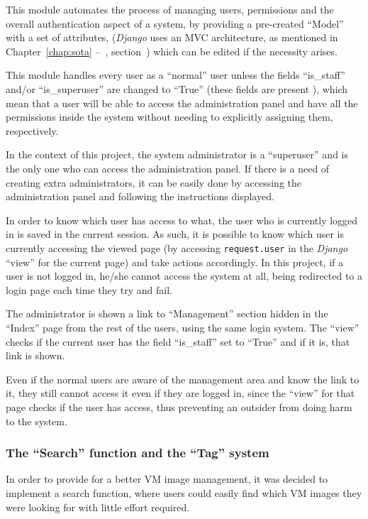 This module automates the process of managing users, permissions and the overall authentication aspect of a system, by providing a pre-created ``Model'' with a set of attributes,  (\textit{Django} uses an MVC architecture, as mentioned in Chapter~\ref{chap:sota} --~, section~) which can be edited if the necessity arises.

This module handles every user as a ``normal'' user unless the fields ``is\_staff'' and/or ``is\_superuser'' are changed to ``True'' (these fields are present ), which mean that a user will be able to access the administration panel and have all the permissions inside the system without needing to explicitly assigning them, respectively.

In the context of this project, the system administrator is a ``superuser'' and is the only one who can access the administration panel. If there is a need of creating extra administrators, it can be easily done by accessing the administration panel and following the instructions displayed.

In order to know which user has access to what, the user who is currently logged in is saved in the current session. As such, it is possible to know which user is currently accessing the viewed page (by accessing \texttt{request.user} in the \textit{Django} ``view'' for the current page) and take actions accordingly. In this project, if a user is not logged in, he/she cannot access the system at all, being redirected to a login page each time they try and fail. 

The administrator is shown a link to ``Management'' section hidden in the ``Index'' page from the rest of the users, using the same login system. The ``view'' checks if the current user has the field ``is\_staff'' set to ``True'' and if it is, that link is shown.

Even if the normal users are aware of the management area and know the link to it, they still cannot access it even if they are logged in, since the ``view'' for that page checks if the user has access, thus preventing an outsider from doing harm to the system.

\subsubsection{The ``Search'' function and the ``Tag'' system}

In order to provide for a better VM image management, it was decided to implement a search function, where users could easily find which VM images they were looking for with little effort required. 

